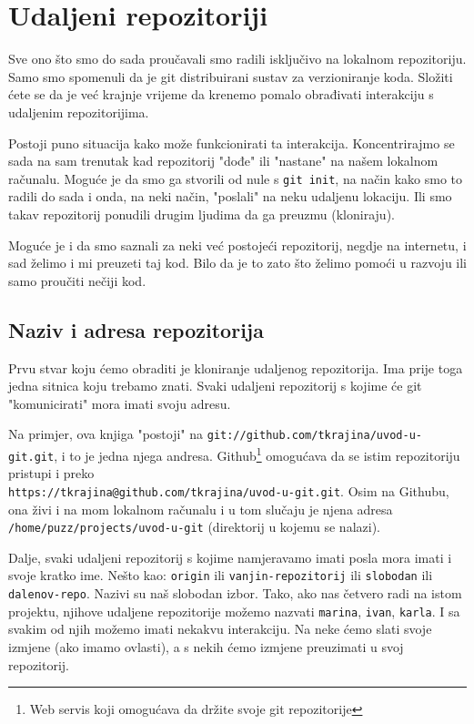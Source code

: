 \chapter*{Udaljeni repozitoriji}

Sve ono što smo do sada proučavali smo radili isključivo na lokalnom repozitoriju.
Samo smo spomenuli da je git distribuirani sustav za verzioniranje koda. 
Složiti ćete se da je već krajnje vrijeme da krenemo pomalo obrađivati interakciju s udaljenim repozitorijima.

Postoji puno situacija kako može funkcionirati ta interakcija.
Koncentrirajmo se sada na sam trenutak kad repozitorij "dođe" ili "nastane" na našem lokalnom računalu.
Moguće je da smo ga stvorili od nule s \verb+git init+, na način kako smo to radili do sada i onda, na neki način, "poslali" na neku udaljenu lokaciju.
Ili smo takav repozitorij ponudili drugim ljudima da ga preuzmu (kloniraju).

Moguće je i da smo saznali za neki već postojeći repozitorij, negdje na internetu, i sad želimo i mi preuzeti taj kod.
Bilo da je to zato što želimo pomoći u razvoju ili samo proučiti nečiji kod.

\section*{Naziv i adresa repozitorija}

Prvu stvar koju ćemo obraditi je kloniranje udaljenog repozitorija.
Ima prije toga jedna sitnica koju trebamo znati.
Svaki udaljeni repozitorij s kojime će git "komunicirati" mora imati svoju adresu.

Na primjer, ova knjiga "postoji" na \verb+git://github.com/tkrajina/uvod-u-git.git+, i to je jedna njega andresa.
Github\footnote{Web servis koji omogućava da držite svoje git repozitorije} omogućava da se istim repozitoriju pristupi i preko \\ \verb+https://tkrajina@github.com/tkrajina/uvod-u-git.git+.
Osim na Githubu, ona živi i na mom lokalnom računalu i u tom slučaju je njena adresa \\\verb+/home/puzz/projects/uvod-u-git+ (direktorij u kojemu se nalazi).

Dalje, svaki udaljeni repozitorij s kojime namjeravamo imati posla mora imati i svoje kratko ime.
Nešto kao: \verb+origin+ ili \verb+vanjin-repozitorij+ ili \verb+slobodan+ ili \verb+dalenov-repo+.
Nazivi su naš slobodan izbor. 
Tako, ako nas četvero radi na istom projektu, njihove udaljene repozitorije možemo nazvati \verb+marina+, \verb+ivan+, \verb+karla+.
I sa svakim od njih možemo imati nekakvu interakciju. 
Na neke ćemo slati svoje izmjene (ako imamo ovlasti), a s nekih ćemo izmjene preuzimati u svoj repozitorij.

